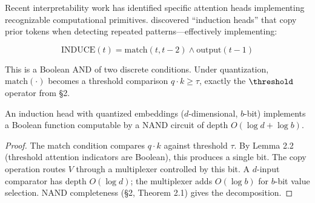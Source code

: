 Recent interpretability work has identified specific attention heads implementing recognizable computational primitives. \citet{olsson2022head} discovered ``induction heads'' that copy prior tokens when detecting repeated patterns---effectively implementing:





\begin{equation}





  \text{INDUCE}(t) = \text{match}(t, t{-}2) \land \text{output}(t{-}1)





\end{equation}





This is a Boolean AND of two discrete conditions. Under quantization, $\text{match}(\cdot)$ becomes a threshold comparison $q \cdot k \geq \tau$, exactly the $\threshold$ operator from \S2.











\begin{theorem}





An induction head with quantized embeddings ($d$-dimensional, $b$-bit) implements a Boolean function computable by a NAND circuit of depth $O(\log d + \log b)$.





\end{theorem}





\begin{proof}





The match condition compares $q \cdot k$ against threshold $\tau$. By Lemma 2.2 (threshold attention indicators are Boolean), this produces a single bit. The copy operation routes $V$ through a multiplexer controlled by this bit. A $d$-input comparator has depth $O(\log d)$; the multiplexer adds $O(\log b)$ for $b$-bit value selection. NAND completeness (\S2, Theorem 2.1) gives the decomposition.





\end{proof}












